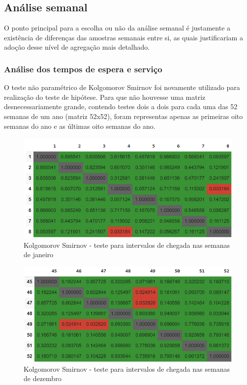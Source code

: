 \subsection{Análise semanal}
O ponto principal para a escolha ou não da análise semanal é justamente a existência de diferenças das amostras semanais entre si, as quais justificariam a adoção desse nível de agregação mais detalhado.\\

\subsubsection{Análise dos tempos de espera e serviço}
O teste não paramétrico de Kolgomorov Smirnov foi novamente utilizado para realização do teste de hipótese. Para que não houvesse uma matriz desnecessariamente grande, contendo testes dois a dois para cada uma das 52 semanas de um ano (matriz 52x52), foram representas apenas as primeiras oito semanas do ano e as últimas oito semanas do ano.

\begin{figure}[H]
    \includegraphics{analise-de-dados/semanal/janas.png}
    \caption{Kolgomorov Smirnov - teste para intervalos de chegada nas semanas de janeiro}
    \label{fig: jan_as_img}
\end{figure}

\begin{figure}[H]
    \includegraphics{analise-de-dados/semanal/dezas.png}
    \caption{Kolgomorov Smirnov - teste para intervalos de chegada nas semanas de dezembro}
    \label{fig: dez_as_img}
\end{figure}

